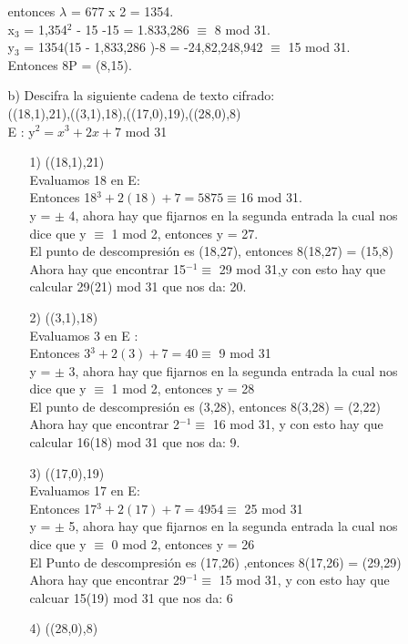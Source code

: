 \documentclass[11pt,letterpaper]{article}
\begin{document}
\begin{enumerate}
\begin{itemize}
entonces $\lambda$ = 677 x 2 = 1354.\\
x$_{3}$ = 1,354$^{2}$ - 15 -15 = 1.833,286 $\equiv$ 8 mod 31.\\
y$_{3}$ = 1354(15 - 1,833,286 )-8 = -24,82,248,942 $\equiv$ 15 mod 31.\\
Entonces 8P = (8,15).
\item[b)] Descifra la siguiente cadena de texto cifrado: \\
((18,1),21),((3,1),18),((17,0),19),((28,0),8)\\
E : y$^{2} = x^{3} + 2x + 7$ mod 31
\begin{itemize}
\item[1)] ((18,1),21)\\
Evaluamos 18 en E:\\
Entonces 18$^{3} +2(18) + 7 = 5875 \equiv $16 mod 31.\\
y = $\pm$ 4, ahora hay que fijarnos en la segunda entrada la cual nos dice que y $\equiv$ 1 mod 2, entonces y = 27.\\
El punto de descompresión es (18,27), entonces 8(18,27) = (15,8)\\
Ahora hay que encontrar 15$^{-1} \equiv $ 29 mod 31,y con esto hay que calcular 29(21) mod 31 que nos da: 20.
\item[2)] ((3,1),18)\\
Evaluamos 3 en E :\\
Entonces 3$^{3} + 2(3) + 7 = 40 \equiv $ 9 mod 31\\
y = $\pm$ 3, ahora hay que fijarnos en la segunda entrada la cual nos dice que y $\equiv$ 1 mod 2, entonces y = 28 \\ 
El punto de descompresión es (3,28), entonces 8(3,28) = (2,22)\\
Ahora hay que encontrar 2$^{-1} \equiv$ 16 mod 31, y con esto hay que calcular 16(18) mod 31 que nos da: 9.
\item[3)] ((17,0),19)\\
Evaluamos 17 en E:\\
Entonces 17$^{3} + 2(17) + 7 = 4954 \equiv$ 25 mod 31\\
y = $\pm$ 5, ahora hay que fijarnos en la segunda entrada la cual nos dice que y $\equiv$ 0 mod 2, entonces y = 26\\
El Punto de descompresión es (17,26) ,entonces 8(17,26) = (29,29)\\
Ahora hay que encontrar 29$^{-1} \equiv$ 15 mod 31, y con esto hay que calcuar 15(19) mod 31 que nos da: 6
\item[4)] ((28,0),8) \\

\end{itemize}
\end{itemize}
\end{enumerate}
\end{document}
